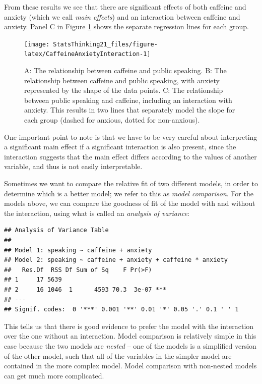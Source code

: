 \documentclass[
  12pt,
]{book}
\begin{document}
From these results we see that there are significant effects of both caffeine and anxiety (which we call \emph{main effects}) and an interaction between caffeine and anxiety. Panel C in Figure \ref{fig:CaffeineAnxietyInteraction} shows the separate regression lines for each group.

\begin{figure}
\texttt{[image: StatsThinking21\_files/figure-latex/CaffeineAnxietyInteraction-1]} \caption{A: The relationship between caffeine and public speaking. B: The relationship between caffeine and public speaking, with anxiety represented by the shape of the data points. C: The relationship between public speaking and caffeine, including an interaction with anxiety.  This results in two lines that separately model the slope for each group (dashed for anxious, dotted for non-anxious).}\label{fig:CaffeineAnxietyInteraction}
\end{figure}

One important point to note is that we have to be very careful about interpreting a significant main effect if a significant interaction is also present, since the interaction suggests that the main effect differs according to the values of another variable, and thus is not easily interpretable.

Sometimes we want to compare the relative fit of two different models, in order to determine which is a better model; we refer to this as \emph{model comparison}. For the models above, we can compare the goodness of fit of the model with and without the interaction, using what is called an \emph{analysis of variance}:

\begin{verbatim}
## Analysis of Variance Table
## 
## Model 1: speaking ~ caffeine + anxiety
## Model 2: speaking ~ caffeine + anxiety + caffeine * anxiety
##   Res.Df  RSS Df Sum of Sq    F Pr(>F)    
## 1     17 5639                             
## 2     16 1046  1      4593 70.3  3e-07 ***
## ---
## Signif. codes:  0 '***' 0.001 '**' 0.01 '*' 0.05 '.' 0.1 ' ' 1
\end{verbatim}

This tells us that there is good evidence to prefer the model with the interaction over the one without an interaction. Model comparison is relatively simple in this case because the two models are \emph{nested} -- one of the models is a simplified version of the other model, such that all of the variables in the simpler model are contained in the more complex model. Model comparison with non-nested models can get much more complicated.
\end{document}
